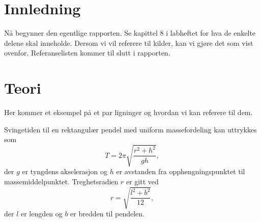 \documentclass[5p]{elsarticle}	            	%
\renewenvironment{abstract}{\global\setbox\absbox=\vbox\bgroup
\hsize=\textwidth\def\baselinestretch{1}%
\noindent\unskip\textbf{Sammendrag}
\par\medskip\noindent\unskip\ignorespaces}
{\egroup}
\begin{document}


\section{Innledning}
Nå begynner den egentlige rapporten. Se kapittel 8 i lab\-heftet \cite{labhefte} for hva de enkelte delene skal inneholde. Dersom vi vil referere til kilder, kan vi gjøre det som vist ovenfor. Referanselisten kommer til slutt i rapporten.


\section{Teori}
Her kommer et eksempel på et par ligninger og hvordan vi kan referere til dem.

Svingetiden til en rektangulær pendel med uniform massefordeling kan uttrykkes som 
\begin{equation}
	T = 2\pi \sqrt {\frac{ r^2  + h^2 }{ gh } },
	\label{svingetid} %
\end{equation}
der $g$ er tyngdens akselerasjon og $h$ er avstanden fra opphengningspunktet til massemiddelpunktet. Treghetsradien $r$ er gitt ved
\begin{equation}
	r = \sqrt {\frac{ l^2  + b^2 }{12} },
	\label{treghetsradius}
\end{equation}
der $l$ er lengden og $b$ er bredden til pendelen.

\end{document}
